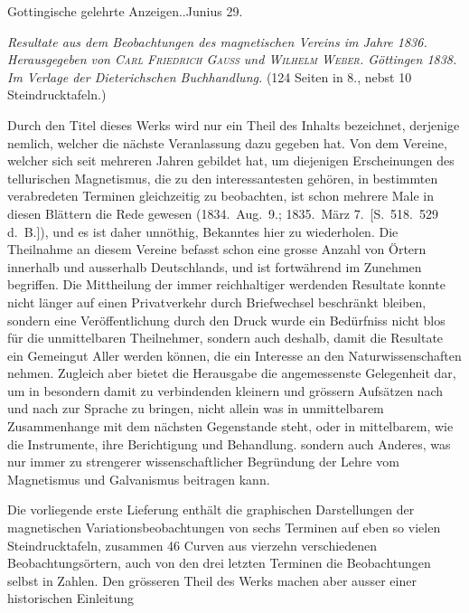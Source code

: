 \vspace{6mm}
\begin{center}\small Gottingische gelehrte Anzeigen..\quad Junius 29.\end{center}

\textit{Resultate aus dem Beobachtungen des magnetischen Vereins im Jahre \textup{1836.} Herausgegeben von \textup{\textsc{Carl Friedrich Gauss}} und \textup{\textsc{Wilhelm Weber}}. Göttingen \textup{1838.} Im Verlage der Dieterichschen Buchhandlung.} (124 Seiten in 8., nebst 10 Steindrucktafeln.)

Durch den Titel dieses Werks wird nur ein Theil des Inhalts bezeichnet, derjenige nemlich, welcher die nächste Veranlassung dazu gegeben hat. Von dem Vereine, welcher sich seit mehreren Jahren gebildet hat, um diejenigen Erscheinungen des tellurischen Magnetismus, die zu den interessantesten gehören, in bestimmten verabredeten Terminen gleichzeitig zu beobachten, ist schon mehrere Male in diesen Blättern die Rede gewesen (1834.\ Aug.\ 9.; 1835.\ März 7.\ [S.\ 518.\ 529 d.\ B.]), und es ist daher unnöthig, Bekanntes hier zu wiederholen. Die Theilnahme an diesem Vereine befasst schon eine grosse Anzahl von Örtern innerhalb und ausserhalb Deutschlands, und ist fortwährend im Zunehmen begriffen. Die Mittheilung der immer reichhaltiger werdenden Resultate konnte nicht länger auf einen Privatverkehr durch Briefwechsel beschränkt bleiben, sondern eine Veröffentlichung durch den Druck wurde ein Bedürfniss nicht blos für die unmittelbaren Theilnehmer, sondern auch deshalb, damit die Resultate ein Gemeingut Aller werden können, die ein Interesse an den Naturwissenschaften nehmen. Zugleich aber bietet die Herausgabe die angemessenste Gelegenheit dar, um in besondern damit zu verbindenden kleinern und grössern Aufsätzen nach und nach zur Sprache zu bringen, nicht allein was in unmittelbarem Zusammenhange mit dem nächsten Gegenstande steht, oder in mittelbarem, wie die Instrumente, ihre Berichtigung und Behandlung. sondern auch Anderes, was nur immer zu strengerer wissenschaftlicher Begründung der Lehre vom Magnetismus und Galvanismus beitragen kann.

Die vorliegende erste Lieferung enthält die graphischen Darstellungen der magnetischen Variationsbeobachtungen von sechs Terminen auf eben so vielen Steindrucktafeln, zusammen 46 Curven aus vierzehn verschiedenen Beobachtungsörtern, auch von den drei letzten Terminen die Beobachtungen selbst in Zahlen. Den grösseren Theil des Werks machen aber ausser einer historischen Einleitung
